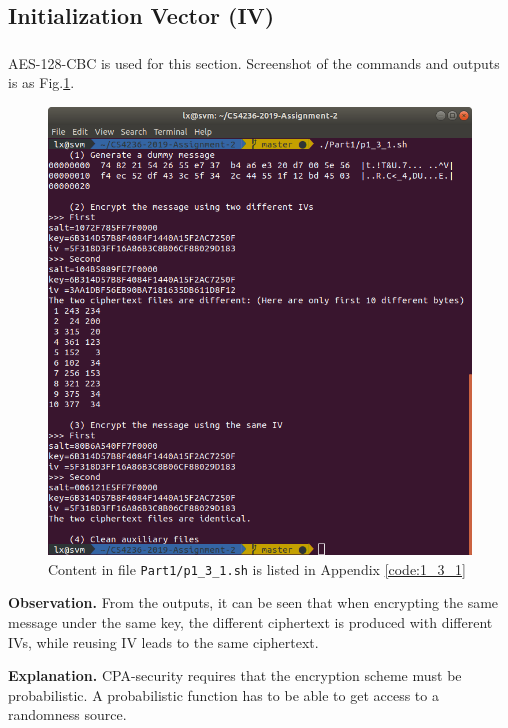 \subsection{Initialization Vector (IV)}

\subsubsection{}

AES-128-CBC is used for this section. Screenshot of the commands and outputs is as Fig.\ref{fig:p1_3_1}.

\begin{figure}[tb!]
\centering
\includegraphics[width=\columnwidth]{pictures/p1_3_1.png}
\caption{
    Content in file \texttt{Part1/p1\_3\_1.sh} is listed in Appendix \ref{code:1_3_1}
}
\label{fig:p1_3_1}
\end{figure}

\textbf{Observation.}
From the outputs, it can be seen that when encrypting the same message under the same key, the different ciphertext is produced with different IVs, while reusing IV leads to the same ciphertext.

\textbf{Explanation.}
CPA-security requires that the encryption scheme must be probabilistic. 
A probabilistic function has to be able to get access to a randomness source.


